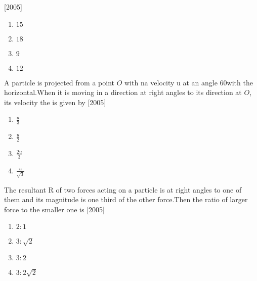 \hfill{[2005]}
\begin{enumerate}
\item $15$
\item $18$
\item $9$
\item $12$
\end{enumerate}
\item A particle is projected from a point $O$ with na velocity u at an angle 60\degree with the horizontal.When it is moving in a direction at right angles to its direction at $O$, its velocity the is given by
\hfill{[2005]}
\begin{enumerate}
\item $\frac{u}{3}$
\item $\frac{u}{2}$
\item $\frac{2u}{3}$
\item $\frac{u}{\sqrt{3}}$
\end{enumerate}
\item The resultant R of two forces acting on a particle is at right angles to one of them and its magnitude is one third of the other force.Then the ratio of larger force to the smaller one is 
\hfill{[2005]}
\begin{enumerate}
\item $ 2\colon 1$
\item $ 3\colon \sqrt{2}$
\item $ 3\colon 2$
\item $ 3\colon 2\sqrt{2}$
\end{enumerate}




